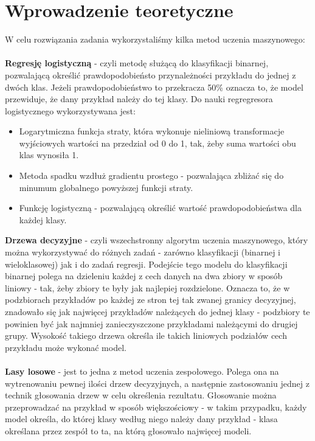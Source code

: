 \documentclass[11pt, a4paper, notitlepage]{report}
\begin{document}
\section{Wprowadzenie teoretyczne}
	W celu rozwiązania zadania wykorzystaliśmy kilka metod uczenia maszynowego: \\ \\
	{\bf Regresję logistyczną} - czyli metodę służącą do klasyfikacji binarnej, pozwalającą określić prawdopodobieństo przynależności przykładu do jednej z dwóch klas. Jeżeli prawdopodobieństwo to przekracza 50\% oznacza to, że model przewiduje, że dany przykład należy
	do tej klasy. Do nauki regregresora logistycznego wykorzystywana jest:
	\begin{itemize}
	  \item Logarytmiczna funkcja straty, która wykonuje nieliniową transformacje wyjściowych wartości na przedział od 0 do 1, tak, żeby suma wartości obu klas wynosiła 1. 
	  \item Metoda spadku wzdłuż gradientu prostego - pozwalająca zbliżać się do minumum globalnego powyższej funkcji straty.
	  \item Funkcję logistyczną - pozwalającą określić wartość prawdopodobieństwa dla każdej klasy.
	 \end{itemize} 
	{\bf Drzewa decyzyjne} - czyli wszechstronny algorytm uczenia maszynowego, który można wykorzystywać do różnych zadań - zarówno klasyfikacji (binarnej i wieloklasowej) jak i do zadań regresji. Podejście tego modelu do klasyfikacji binarnej polega na
	 dzieleniu każdej z cech danych na dwa zbiory w sposób liniowy - tak, żeby zbiory te były jak najlepiej rozdzielone. Oznacza to, że w podzbiorach przykładów po każdej ze stron tej tak zwanej granicy decyzyjnej, znadowało się jak najwięcej przykładów należących do jednej klasy - 
	 podzbiory te powinien być jak najmniej zanieczyszczone przykładami należącymi do drugiej grupy. Wysokość takiego drzewa określa ile takich liniowych podziałów cech przykładu może wykonać model. \\ \\
	{\bf Lasy losowe} - jest to jedna z metod uczenia zespołowego. Polega ona na wytrenowaniu pewnej ilości drzew decyzyjnych, a następnie zastosowaniu jednej z technik głosowania drzew w celu określenia rezultatu. Głosowanie można przeprowadzać na przykład w sposób
	 większościowy - w takim przypadku, każdy model określa, do której klasy według niego należy dany przykład - klasa określana przez zespół to ta, na którą głosowało najwięcej modeli. \\ \\
\end{document}
